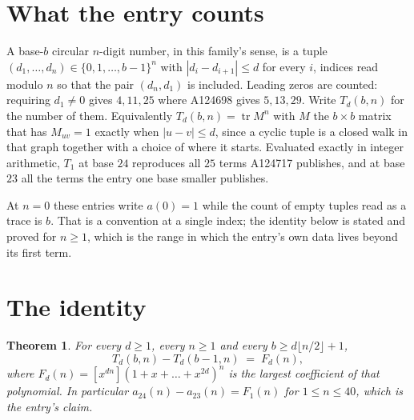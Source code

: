 \documentclass[11pt,a4paper]{article}
\theoremstyle{plain}
\newtheorem{theorem}{Theorem}
\theoremstyle{definition}
\begin{document}
\section{What the entry counts}

A base-$b$ circular $n$-digit number, in this family's sense, is a tuple
$(d_1,\dots,d_n)\in\{0,1,\dots,b-1\}^{n}$ with $|d_i-d_{i+1}|\le d$ for every $i$, indices
read modulo $n$ so that the pair $(d_n,d_1)$ is included. Leading zeros are counted: requiring
$d_1\ne0$ gives $4,11,25$ where A124698 gives $5,13,29$. Write $T_d(b,n)$ for the number of
them. Equivalently $T_d(b,n)=\operatorname{tr}M^{n}$ with $M$ the $b\times b$ matrix that has
$M_{uv}=1$ exactly when $|u-v|\le d$, since a cyclic tuple is a closed walk in that graph
together with a choice of where it starts. Evaluated exactly in integer arithmetic, $T_{1}$
at base $24$ reproduces all $25$ terms A124717 publishes, and at base $23$ all the
terms the entry one base smaller publishes.

At $n=0$ these entries write $a(0)=1$ while the count of empty tuples read as a trace is $b$.
That is a convention at a single index; the identity below is stated and proved for $n\ge1$,
which is the range in which the entry's own data lives beyond its first term.

\section{The identity}

\begin{theorem}
For every $d\ge1$, every $n\ge1$ and every $b\ge d\lfloor n/2\rfloor+1$,
\[
T_d(b,n)-T_d(b-1,n)\;=\;F_d(n),
\]
where $F_d(n)=[x^{dn}](1+x+\dots+x^{2d})^{n}$ is the largest coefficient of that
polynomial. In particular $a_{24}(n)-a_{23}(n)=F_{1}(n)$ for $1\le n\le40$, which
is the entry's claim.
\end{theorem}
\end{document}
